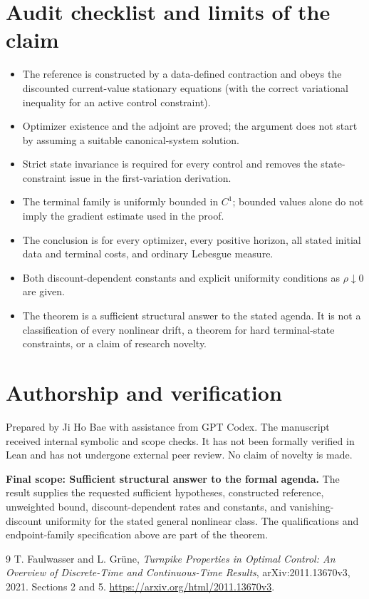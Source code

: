 \documentclass[11pt,a4paper]{article}
\begin{document}
\section{Audit checklist and limits of the claim}
\begin{itemize}
\item The reference is constructed by a data-defined contraction and
obeys the discounted current-value stationary equations (with the correct
variational inequality for an active control constraint).
\item Optimizer existence and the adjoint are proved; the argument does
not start by assuming a suitable canonical-system solution.
\item Strict state invariance is required for every control and removes
the state-constraint issue in the first-variation derivation.
\item The terminal family is uniformly bounded in $C^1$; bounded values
alone do not imply the gradient estimate used in the proof.
\item The conclusion is for every optimizer, every positive horizon,
all stated initial data and terminal costs, and ordinary Lebesgue measure.
\item Both discount-dependent constants and explicit uniformity
conditions as $\rho\downarrow0$ are given.
\item The theorem is a sufficient structural answer to the stated
agenda. It is not a classification of every nonlinear drift, a theorem
for hard terminal-state constraints, or a claim of research novelty.
\end{itemize}

\section*{Authorship and verification}
Prepared by Ji Ho Bae with assistance from GPT Codex. The manuscript
received internal symbolic and scope checks. It has not been formally
verified in Lean and has not undergone external peer review. No claim of
novelty is made.

\noindent\textbf{Final scope: Sufficient structural answer to the formal agenda.}
The result supplies the requested sufficient hypotheses, constructed
reference, unweighted bound, discount-dependent rates and constants, and
vanishing-discount uniformity for the stated general nonlinear class.
The qualifications and endpoint-family specification above are part of
the theorem.

\begin{thebibliography}{9}
T. Faulwasser and L. Gr\"une,
\emph{Turnpike Properties in Optimal Control: An Overview of Discrete-Time
and Continuous-Time Results}, arXiv:2011.13670v3, 2021.
Sections 2 and 5.
\url{https://arxiv.org/html/2011.13670v3}.
\end{thebibliography}
\end{document}
